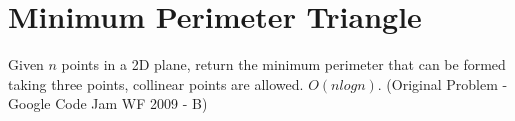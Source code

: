     \section{Minimum Perimeter Triangle}
    Given $n$ points in a 2D plane, return the minimum perimeter that can be formed taking three points, collinear points are allowed. $O(nlogn)$. (Original Problem - Google Code Jam WF 2009 - B)
